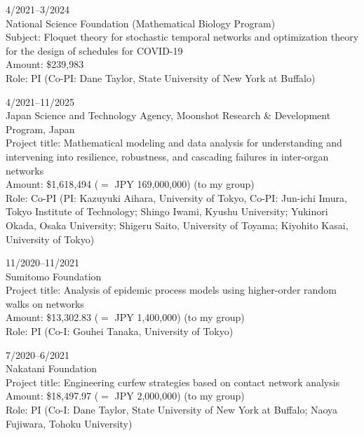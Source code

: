 \documentclass[11pt,letter]{article}
\renewenvironment{itemize}{
  \begin{list}{}{
    \setlength{\leftmargin}{1.5em}
    \setlength{\itemsep}{0.25em}
    \setlength{\parskip}{0pt}
    \setlength{\parsep}{0.25em}
  }
}{
  \end{list}
}
\begin{document}
\begin{itemize}
\item 4/2021--3/2024\\
National Science Foundation (Mathematical Biology Program)\\
Subject: Floquet theory for stochastic temporal networks and optimization theory for the design of schedules for COVID-19\\
Amount: \$239,983\\ %
Role: PI  (Co-PI: Dane Taylor, State University of New York at Buffalo)

\item
4/2021--11/2025\\
Japan Science and Technology Agency, Moonshot Research \& Development Program, Japan\\
Project title: Mathematical modeling and data analysis for understanding and intervening into resilience, robustness, and cascading failures in inter-organ networks\\
%
%
Amount: \$1,618,494 ($=$ JPY 169,000,000) (to my group)\\
Role: Co-PI (PI: Kazuyuki Aihara, University of Tokyo, Co-PI: Jun-ichi Imura, Tokyo Institute of Technology; Shingo Iwami, Kyushu University; Yukinori Okada, Osaka University; Shigeru Saito, University of Toyama; Kiyohito Kasai, University of Tokyo)

\item 
11/2020--11/2021\\
Sumitomo Foundation\\
Project title: Analysis of epidemic process models using higher-order random walks on networks\\
Amount: \$13,302.83 ($=$ JPY 1,400,000) (to my group)\\
Role: PI (Co-I: Gouhei Tanaka, University of Tokyo)

\item 
7/2020--6/2021\\
Nakatani Foundation\\
%
Project title: Engineering curfew strategies based on contact network analysis
\\
Amount: \$18,497.97 ($=$ JPY 2,000,000) (to my group)\\
Role: PI (Co-I: Dane Taylor, State University of New York at Buffalo; Naoya Fujiwara, Tohoku University)
%


\end{itemize}
\end{document}

